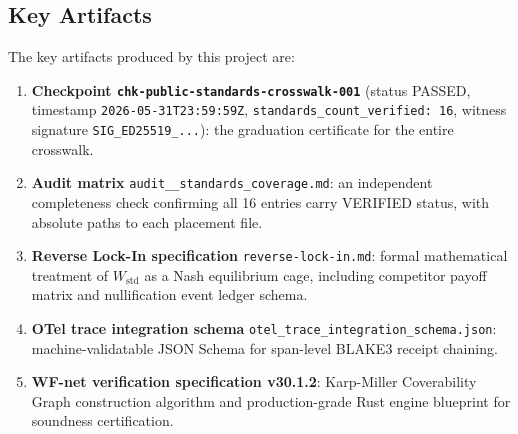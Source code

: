 \subsection{Key Artifacts}
\label{sec:standards-identity-artifacts}

The key artifacts produced by this project are:

\begin{enumerate}
  \item \textbf{Checkpoint \texttt{chk-public-standards-crosswalk-001}} (status PASSED,
        timestamp \texttt{2026-05-31T23:59:59Z}, \texttt{standards\_count\_verified: 16},
        witness signature \texttt{SIG\_ED25519\_...}): the graduation certificate for the
        entire crosswalk.
  \item \textbf{Audit matrix} \texttt{audit\_\_standards\_coverage.md}: an independent
        completeness check confirming all 16 entries carry VERIFIED status, with absolute
        paths to each placement file.
  \item \textbf{Reverse Lock-In specification} \texttt{reverse-lock-in.md}: formal
        mathematical treatment of $W_{\text{std}}$ as a Nash equilibrium cage, including
        competitor payoff matrix and nullification event ledger schema.
  \item \textbf{OTel trace integration schema} \texttt{otel\_trace\_integration\_schema.json}:
        machine-validatable JSON Schema for span-level BLAKE3 receipt chaining.
  \item \textbf{WF-net verification specification v30.1.2}: Karp-Miller Coverability Graph
        construction algorithm and production-grade Rust engine blueprint for soundness
        certification.
\end{enumerate}

